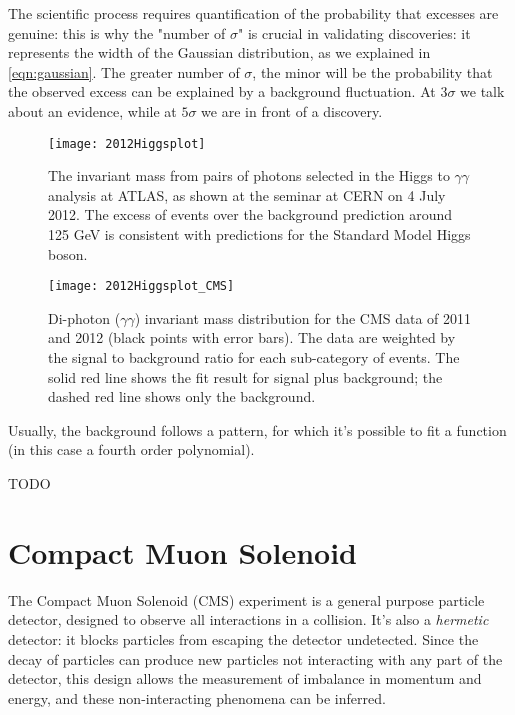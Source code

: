 The scientific process requires quantification of the probability that excesses are genuine: this is why the "number of $\sigma$" is crucial in validating discoveries: it represents the width of the Gaussian distribution, as we explained in \ref{eqn:gaussian}. The greater number of $\sigma$, the minor will be the probability that the observed excess can be explained by a background fluctuation.
At $3\sigma$ we talk about an evidence, while at $5\sigma$ we are in front of a discovery.

\begin{figure}
	\centerline{
		\texttt{[image: 2012Higgsplot]}}
	\caption{The invariant mass from pairs of photons selected in the Higgs to $\gamma\gamma$ analysis at ATLAS, as shown at the seminar at CERN on 4 July 2012. The excess of events over the background prediction around 125 GeV is consistent with predictions for the Standard Model Higgs boson.\cite{Collaboration:2627611}}
\end{figure}

\begin{figure}
	\centerline{
		\texttt{[image: 2012Higgsplot\_CMS]}}
	\caption{Di-photon ($\gamma\gamma$) invariant mass distribution for the CMS data of 2011 and 2012 (black points with error bars). The data are weighted by the signal to background ratio for each sub-category of events. The solid red line shows the fit result for signal plus background; the dashed red line shows only the background. \cite{Collaboration:1459463}}
\end{figure}


Usually, the background follows a pattern, for which it's possible to fit a function (in this case a fourth order polynomial).

TODO


\section{Compact Muon Solenoid}

The Compact Muon Solenoid (CMS) experiment is a general purpose particle detector, designed to observe all interactions in a collision. It's also a \textit{hermetic} detector: it blocks particles from escaping the detector undetected. Since the decay of particles can produce new particles not interacting with any part of the detector, this design allows the measurement of imbalance in momentum and energy, and these non-interacting phenomena can be inferred.

